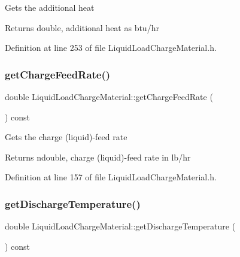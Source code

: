 Gets the additional heat \begin{DoxyReturn}{Returns}
double, additional heat as btu/hr 
\end{DoxyReturn}


Definition at line 253 of file Liquid\+Load\+Charge\+Material.\+h.

\mbox{\label{class_liquid_load_charge_material_af818c541527b3b28a8f84a08dc0c884e}} 
\subsubsection{\texorpdfstring{get\+Charge\+Feed\+Rate()}{getChargeFeedRate()}}
{\footnotesize\ttfamily double Liquid\+Load\+Charge\+Material\+::get\+Charge\+Feed\+Rate (\begin{DoxyParamCaption}{ }\end{DoxyParamCaption}) const\hspace{0.3cm}{\ttfamily [inline]}}

Gets the charge (liquid)-\/feed rate \begin{DoxyReturn}{Returns}
ndouble, charge (liquid)-\/feed rate in lb/hr 
\end{DoxyReturn}


Definition at line 157 of file Liquid\+Load\+Charge\+Material.\+h.

\mbox{\label{class_liquid_load_charge_material_ad474f33059c99aa94e1d63738e11ff0e}} 
\subsubsection{\texorpdfstring{get\+Discharge\+Temperature()}{getDischargeTemperature()}}
{\footnotesize\ttfamily double Liquid\+Load\+Charge\+Material\+::get\+Discharge\+Temperature (\begin{DoxyParamCaption}{ }\end{DoxyParamCaption}) const\hspace{0.3cm}{\ttfamily [inline]}}

